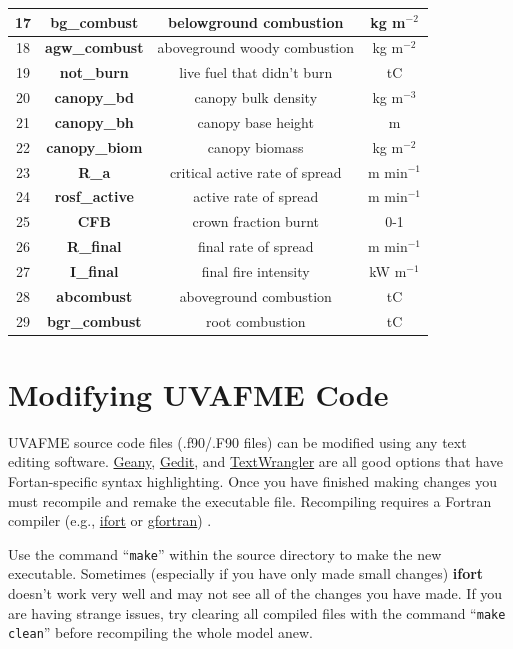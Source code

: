 \documentclass[a4paper, 12pt] {article}
\begin{document}
\begin{table} [H]
{\begin{tabular}{|c|c|c|c|}
			17 & \textbf{bg\_combust} & belowground combustion & kg m$^{-2}$   \\
			\hline 
			18 & \textbf{agw\_combust} & aboveground woody combustion & kg m$^{-2}$   \\
			\hline 
			19 & \textbf{not\_burn} & live fuel that didn't burn & tC   \\
			\hline 
			20 & \textbf{canopy\_bd} & canopy bulk density  & kg m$^{-3}$   \\
			\hline 
			21 & \textbf{canopy\_bh} & canopy base height & m  \\
			\hline 
			22 & \textbf{canopy\_biom} & canopy biomass & kg m$^{-2}$   \\
			\hline 
			23 & \textbf{R\_a} & critical active rate of spread & m min$^{-1}$   \\
			\hline 
			24 & \textbf{rosf\_active} & active rate of spread & m min$^{-1}$   \\
			\hline 
			25 & \textbf{CFB} & crown fraction burnt & 0-1   \\
			\hline 
			26 & \textbf{R\_final} & final rate of spread & m min$^{-1}$   \\
			\hline 
			27 & \textbf{I\_final} & final fire intensity  & kW m$^{-1}$   \\
			\hline 
			28 & \textbf{abcombust} & aboveground combustion & tC  \\
			\hline 
			29 & \textbf{bgr\_combust} & root combustion & tC   \\
			\hline 
	\end{tabular}}
\end{table}

\section{Modifying UVAFME Code}

UVAFME source code files (.f90/.F90 files) can be modified using any text editing software. \href{https://www.geany.org}{Geany},  \href{https://help.gnome.org/users/gedit/stable/}{Gedit}, and \href{https://www.barebones.com/products/textwrangler/}{TextWrangler} are all good options that have Fortan-specific syntax highlighting. Once you have finished making changes you must recompile and remake the executable file. Recompiling requires a Fortran compiler (e.g., \href{https://software.intel.com/en-us/fortran-compilers}{ifort} or \href{https://gcc.gnu.org/wiki/GFortran}{gfortran}) .

Use the command ``\texttt{make}” within the source directory to make the new executable. Sometimes (especially if you have only made small changes) \textbf{ifort} doesn’t work very well and may not see all of the changes you have made. If you are having strange issues, try clearing all compiled files with the command ``\texttt{make clean}” before recompiling the whole model anew.
\end{document}
